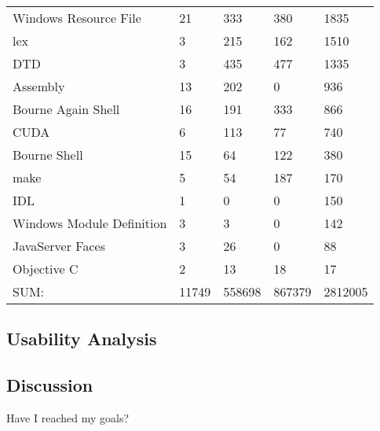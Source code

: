 \begin{table}[h]
\begin{tabular}{ l|l|l|l|l }
		Windows Resource File                 &  21         &   333         &   380        &   1835\\
		lex                                   &   3         &   215         &   162        &   1510\\
		DTD                                   &   3         &   435         &   477        &   1335\\
		Assembly                              &  13         &   202         &     0        &    936\\
		Bourne Again Shell                    &  16         &   191         &   333        &    866\\
		CUDA                                  &   6         &   113         &    77        &    740\\
		Bourne Shell                          &  15         &    64         &   122        &    380\\
		make                                  &   5         &    54         &   187        &    170\\
		IDL                                   &   1         &     0         &     0        &    150\\
		Windows Module Definition             &   3         &     3         &     0        &    142\\
		JavaServer Faces                      &   3         &    26         &     0        &     88\\
		Objective C                           &   2         &    13         &    18        &     17\\
		\hline
		SUM:                                 &11749         &558698         &867379        &2812005\\
		\hline
	\end{tabular}
    \normalfont
    \label{table:VTKStatistic}
\end{table}

\subsection{Usability Analysis}



\subsection{Discussion}
Have I reached my goals?